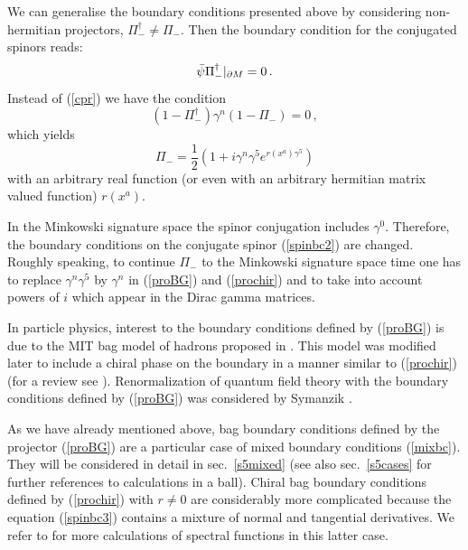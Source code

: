 We can generalise the boundary conditions presented above by
considering non-hermitian projectors, $\Pi_-^\dag \ne \Pi_-$.
Then the boundary condition for the conjugated spinors reads:
\begin{equation}
\bar\psi \Pi_-^\dag \vert_{\partial M} =0\,.\label{spinbc5}
\end{equation}
Instead of (\ref{cpr}) we have the condition
\begin{equation}
(1-\Pi_-^\dag )\gamma^n (1-\Pi_-)=0 \,,\label{cpr2}
\end{equation}
which yields
\begin{equation}
\Pi_-=\frac 12 \left( 1+i\gamma^n\gamma^5 e^{r(x^a)\gamma^5} \right)
\label{prochir}
\end{equation}
with an arbitrary real function (or even with an arbitrary hermitian
matrix valued function) $r(x^a)$. 

In the Minkowski signature space the spinor conjugation
includes $\gamma^0$. Therefore, the boundary conditions
on the conjugate spinor (\ref{spinbc2}) are changed. 
Roughly speaking, to continue $\Pi_-$ to the Minkowski signature
space time one has to replace $\gamma^n\gamma^5$ by $\gamma^n$
in (\ref{proBG}) and (\ref{prochir}) and to take into account
powers of $i$ which appear in the Dirac gamma matrices.

In particle physics, interest to the
boundary conditions defined by (\ref{proBG}) is due to the 
MIT bag model
of hadrons  proposed in \cite{Chodos:1974pn,Chodos:1974je,DeGrand:1975cf}. 
This model was modified later 
\cite{Chodos:1975ix,Callan:1979bm,Brown:1979ui,
Theberge:1980ye,Rho:1983bh,Goldstone:1983tu}
to include a chiral phase on the boundary in a manner similar to
(\ref{prochir})
(for a review see \cite{Hasenfratz:1978dt}).
Renormalization of quantum field theory with the boundary
conditions defined by (\ref{proBG}) was
considered by Symanzik \cite{Symanzik:1981wd}.

As we have already mentioned above, bag boundary conditions defined
by the projector (\ref{proBG}) are a particular case of mixed boundary
conditions (\ref{mixbc}). They will be considered in detail in sec.\
\ref{s5mixed} (see also sec.\ \ref{s5cases} for further references to
calculations in a ball). Chiral bag boundary conditions defined
by (\ref{prochir}) with $r\ne 0$ are considerably more complicated
because the equation (\ref{spinbc3}) contains a mixture of normal
and tangential derivatives.
We refer to 
\cite{Hrasko:1984sj,Falomir:1990tm,Falomir:1991fy,DeFrancia:1992sf,Wipf:1995dy,
DeFrancia:1996xi,DeFrancia:1998if,Beneventano:2002im,Esposito:2002vz}
for more calculations of spectral functions in this latter case. 

